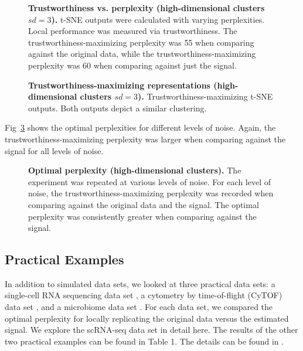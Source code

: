 \documentclass[10pt,letterpaper]{article}
\begin{document}
\begin{figure}[!h]
\caption{{\bf Trustworthiness vs. perplexity (high-dimensional clusters $sd = 3$).}
t-SNE outputs were calculated with varying perplexities. Local performance was measured via trustworthiness. The trustworthiness-maximizing perplexity was 55 when comparing against the original data, while the trustworthiness-maximizing perplexity was 60 when comparing against just the signal.}
\label{fig6}
\end{figure}

\begin{figure}[!h]
\caption{{\bf Trustworthiness-maximizing representations (high-dimensional clusters $sd = 3$).}
Trustworthiness-maximizing t-SNE outputs. Both outputs depict a similar clustering.}
\label{fig7}
\end{figure}

Fig~\ref{fig8} shows the optimal perplexities for different levels of noise. Again, the trustworthiness-maximizing perplexity was larger when comparing against the signal for all levels of noise.

\begin{figure}[!h]
\caption{{\bf Optimal perplexity (high-dimensional clusters).}
The experiment was repeated at various levels of noise. For each level of noise, the trustworthiness-maximizing perplexity was recorded when comparing against the original data and the signal. The optimal perplexity was consistently greater when comparing against the signal.}
\label{fig8}
\end{figure}

\subsection*{Practical Examples}
In addition to simulated data sets, we looked at three practical data sets: a single-cell RNA sequencing data set \cite{scRNA data}, a cytometry by time-of-flight (CyTOF) data set \cite{CyTOF data}, and a microbiome data set \cite{enterotype data}. For each data set, we compared the optimal perplexity for locally replicating the original data versus the estimated signal. We explore the scRNA-seq data set in detail here. The results of the other two practical examples can be found in Table 1. The details can be found in .
\end{document}
